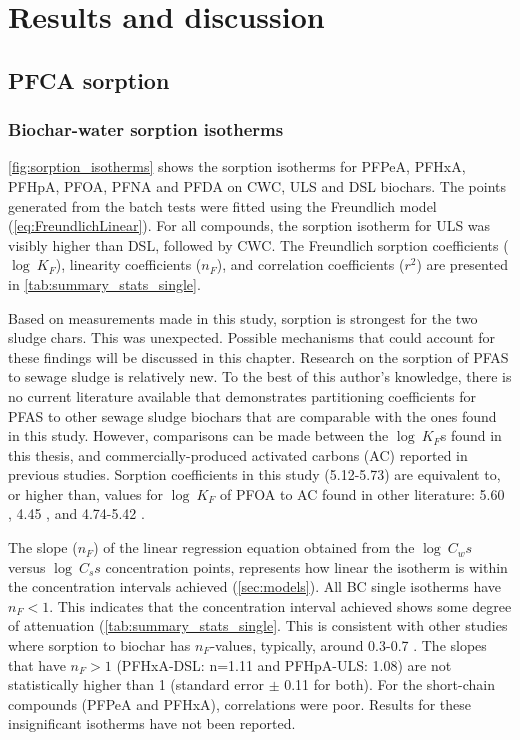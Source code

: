 \chapter{Results and discussion}\label{chap:Results&Disc}
\section{PFCA sorption}
\subsection{Biochar-water sorption isotherms}
\cref{fig:sorption_isotherms} shows the sorption isotherms for PFPeA, PFHxA, PFHpA, PFOA, PFNA and PFDA on CWC, ULS and DSL biochars. The points generated from the batch tests were fitted using the Freundlich model (\cref{eq:FreundlichLinear}). For all compounds, the sorption isotherm for ULS was visibly higher than DSL, followed by CWC. The Freundlich sorption coefficients ($\log~K_F$), linearity coefficients ($n_F$), and correlation coefficients ($r^2$) are presented in \cref{tab:summary_stats_single}. 

Based on measurements made in this study, sorption is strongest for the two sludge chars. This was unexpected. Possible mechanisms that could account for these findings will be discussed in this chapter. Research on the sorption of PFAS to sewage sludge is relatively new. To the best of this author's knowledge, there is no current literature available that demonstrates partitioning coefficients for PFAS to other sewage sludge biochars that are comparable with the ones found in this study. However, comparisons can be made between the $\log~K_F$s found in this thesis, and commercially-produced activated carbons (AC) reported in previous studies. Sorption coefficients in this study (5.12-5.73) are equivalent to, or higher than, values for $\log~K_F$ of PFOA to AC found in other literature: 5.60 \citep{Kupryianchyk2016b}, 4.45 \citep{hansen2010sorption}, and 4.74-5.42 \citep{silvani2019can}. 

The slope ($n_F$) of the linear regression equation obtained from the $\log~C_ws$ versus $\log~C_ss$ concentration points, represents how linear the isotherm is within the concentration intervals achieved (\cref{sec:models}). All BC single isotherms have $n_F<1$. This indicates that the concentration interval achieved shows some degree of attenuation (\cref{tab:summary_stats_single}. This is consistent with other studies where sorption to biochar has $n_F$-values, typically, around 0.3-0.7 \citep{Cornelissen2005}. The slopes that have $n_F>1$ (PFHxA-DSL: n=1.11 and PFHpA-ULS: 1.08) are not statistically higher than 1 (standard error $\pm$ 0.11 for both). For the short-chain compounds (PFPeA and PFHxA), correlations were poor. Results for these insignificant isotherms have not been reported. 

